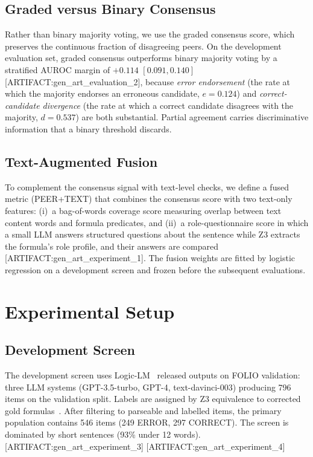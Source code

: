 \documentclass[11pt,letterpaper]{article}
\begin{document}
\subsection{Graded versus Binary Consensus}
\label{sec:graded}

Rather than binary majority voting, we use the graded consensus score, which preserves the continuous fraction of disagreeing peers.
On the development evaluation set, graded consensus outperforms binary majority voting by a stratified AUROC margin of $+0.114$ $[0.091, 0.140]$ [ARTIFACT:gen\_art\_evaluation\_2], because \emph{error endorsement} (the rate at which the majority endorses an erroneous candidate, $e = 0.124$) and \emph{correct-candidate divergence} (the rate at which a correct candidate disagrees with the majority, $d = 0.537$) are both substantial.
Partial agreement carries discriminative information that a binary threshold discards.

\subsection{Text-Augmented Fusion}
\label{sec:fusion}

To complement the consensus signal with text-level checks, we define a fused metric (PEER+TEXT) that combines the consensus score with two text-only features: (i)~a bag-of-words coverage score measuring overlap between text content words and formula predicates, and (ii)~a role-questionnaire score in which a small LLM answers structured questions about the sentence while Z3 extracts the formula's role profile, and their answers are compared [ARTIFACT:gen\_art\_experiment\_1].
The fusion weights are fitted by logistic regression on a development screen and frozen before the subsequent evaluations.

\section{Experimental Setup}
\label{sec:setup}

\subsection{Development Screen}
\label{sec:devscreen}

The development screen uses Logic-LM~\citep{Pan2023} released outputs on FOLIO validation: three LLM systems (GPT-3.5-turbo, GPT-4, text-davinci-003) producing 796 items on the validation split.
Labels are assigned by Z3 equivalence to corrected gold formulas~\citep{Brunello2025}.
After filtering to parseable and labelled items, the primary population contains 546 items (249 ERROR, 297 CORRECT).
The screen is dominated by short sentences (93\% under 12 words).
[ARTIFACT:gen\_art\_experiment\_3] [ARTIFACT:gen\_art\_experiment\_4]
\end{document}

